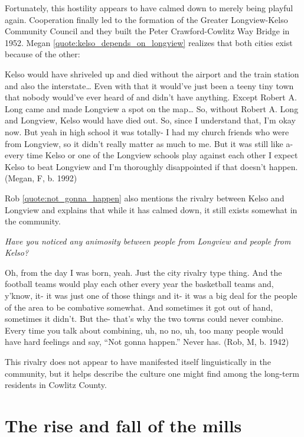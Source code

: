 Fortunately, this hostility appears to have calmed down to merely being playful again. Cooperation finally led to the formation of the Greater Longview-Kelso Community Council and they built the Peter Crawford-Cowlitz Way Bridge in 1952. Megan \ref{quote:kelso_depends_on_longview} realizes that both cities exist because of the other:
\begin{num_quote}
    Kelso would have shriveled up and died without the airport and the train station and also the interstate… Even with that it would've just been a teeny tiny town that nobody would've ever heard of and didn't have anything. Except Robert A. Long came and made Longview a spot on the map… So, without Robert A. Long and Longview, Kelso would have died out. So, since I understand that, I'm okay now. But yeah in high school it was totally- I had my church friends who were from Longview, so it didn't really matter as much to me. But it was still like a- every time Kelso or one of the Longview schools play against each other I expect Kelso to beat Longview and I'm thoroughly disappointed if that doesn't happen. (Megan, F, b. 1992)
    \label{quote:kelso_depends_on_longview}
\end{num_quote}
Rob \ref{quote:not_gonna_happen} also mentions the rivalry between Kelso and Longview and explains that while it has calmed down, it still exists somewhat in the community.
\begin{num_quote}
\textit{Have you noticed any animosity between people from Longview and people from Kelso?}

Oh, from the day I was born, yeah. Just the city rivalry type thing. And the football teams would play each other every year the basketball teams and, y'know, it- it was just one of those things and it- it was a big deal for the people of the area to be combative somewhat. And sometimes it got out of hand, sometimes it didn't. But the- that's why the two towns could never combine. Every time you talk about combining, uh, no no, uh, too many people would have hard feelings and say, ``Not gonna happen.'' Never has. (Rob, M, b. 1942)
\label{quote:not_gonna_happen}
\end{num_quote}
This rivalry does not appear to have manifested itself linguistically in the community, but it helps describe the culture one might find among the long-term residents in Cowlitz County.






\section{The rise and fall of the mills}
\label{sec:rise_and_fall}

